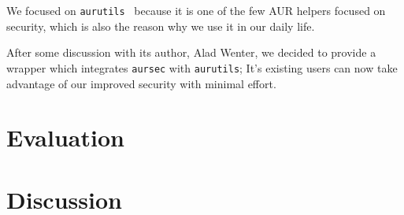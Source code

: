 \documentclass[11pt]{scrartcl}
\begin{document}
    We focused on \texttt{aurutils}~\cite{gh:aurutils} because it is one of the few AUR helpers focused on security, which is also the reason why we use it in our daily life.

    After some discussion with its author, Alad Wenter, we decided to provide a wrapper which integrates \texttt{aursec} with \texttt{aurutils}; It's existing users can now take advantage of our improved security with minimal effort.

  \section{Evaluation}
    

  \section{Discussion}
    


  \appendix
  


  \pagebreak
  
  
\end{document}
